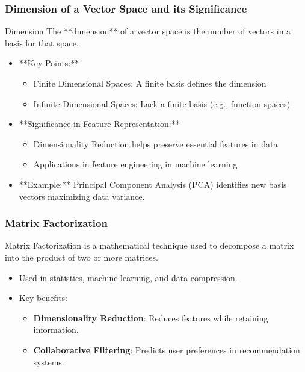 \documentclass{beamer}
\begin{document}
\begin{frame}[fragile]
    \frametitle{Dimension of a Vector Space and its Significance}
    \begin{block}{Dimension}
        The **dimension** of a vector space is the number of vectors in a basis for that space.
    \end{block}
    \begin{itemize}
        \item **Key Points:**
            \begin{itemize}
                \item Finite Dimensional Spaces: A finite basis defines the dimension 
                \item Infinite Dimensional Spaces: Lack a finite basis (e.g., function spaces)
            \end{itemize}
        \item **Significance in Feature Representation:**
            \begin{itemize}
                \item Dimensionality Reduction helps preserve essential features in data
                \item Applications in feature engineering in machine learning
            \end{itemize}
        \item **Example:** Principal Component Analysis (PCA) identifies new basis vectors maximizing data variance.
    \end{itemize}
\end{frame}

\begin{frame}
    \frametitle{Matrix Factorization}
    Matrix Factorization is a mathematical technique used to decompose a matrix into the product of two or more matrices. 
    \begin{itemize}
        \item Used in statistics, machine learning, and data compression.
        \item Key benefits:
        \begin{itemize}
            \item \textbf{Dimensionality Reduction}: Reduces features while retaining information.
            \item \textbf{Collaborative Filtering}: Predicts user preferences in recommendation systems.
        \end{itemize}
    \end{itemize}
\end{frame}
\end{document}
